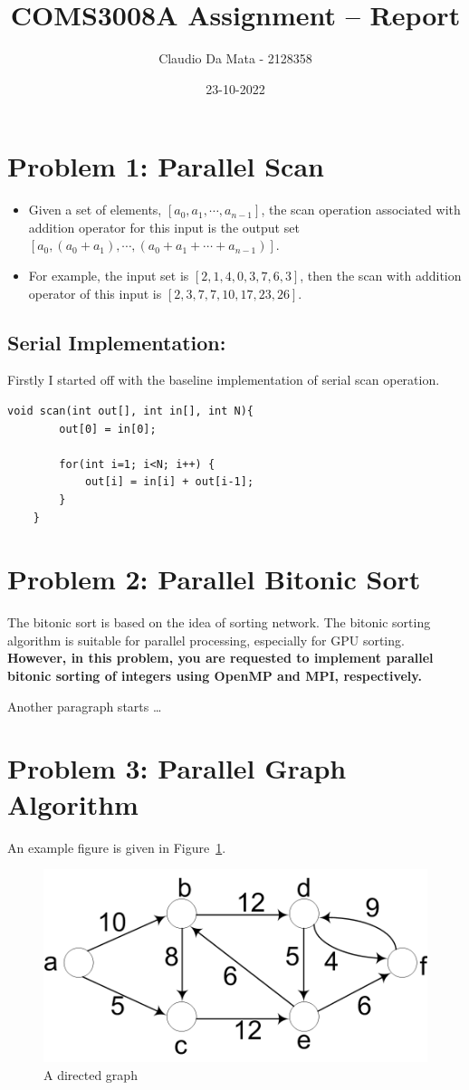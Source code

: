 

\title{COMS3008A Assignment -- Report}
\author{Claudio Da Mata - 2128358}
\date{23-10-2022} 
\maketitle 
\pagestyle{fancy}
\fancyhf{}
\fancyhead[R]{\thepage}
{} 
\section{Problem 1: Parallel Scan}
\begin{itemize}
	\item  Given a set of elements, $[a_0,a_1,\dotsm,a_{n-1}]$, the scan operation associated with addition operator for this input is the output set $[a_0,(a_0+a_1),\dotsm,(a_0+a_1+\dotsm+a_{n-1})]$. 
	\item For example, the input set is $[2,1,4,0,3,7,6,3]$, then the scan with addition operator of this input is $[2,3,7,7,10,17,23,26]$. 
\end{itemize}
\subsection{Serial Implementation:}
Firstly I started off with the baseline implementation of serial scan operation.
\begin{lstlisting}[caption=Sequential algorithm for computing scan operation with ‘+’ operator]
	void scan(int out[], int in[], int N){
		out[0] = in[0];
		
		for(int i=1; i<N; i++) {
			out[i] = in[i] + out[i-1];
		}
	}
\end{lstlisting}

\section{Problem 2: Parallel Bitonic Sort}
The bitonic sort is based on the idea of sorting network. The bitonic sorting algorithm is suitable for parallel processing, especially for GPU sorting. \textbf{However, in this problem, you are requested to implement parallel bitonic sorting of integers using \textbf{OpenMP and MPI}, respectively. }

Another paragraph starts \dots
\section{Problem 3: Parallel Graph Algorithm}
An example figure is given in Figure~\ref{fig:sp_fig1}.
\begin{figure}[htb]
	\centering
	\includegraphics[width=0.5\linewidth]{pics/sp_fig1.png}
	\caption{A directed graph}\label{fig:sp_fig1}
\end{figure}


